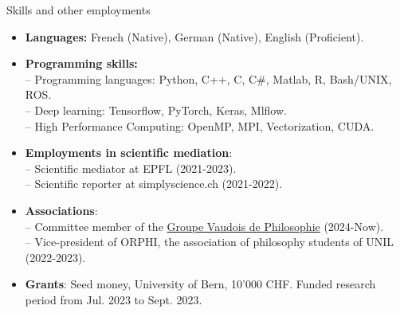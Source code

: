 \documentclass[]{mcdowellcv}
\begin{document}
    \begin{cvsection}{Skills and other employments}
        \begin{cvsubsection}{}{}{}
            \begin{itemize}
            \setlength\itemsep{0.4em}
            \item \textbf{Languages:} French (Native), German (Native), English (Proficient).
               \item \textbf{Programming skills:} \\
                    -- Programming languages: Python, C++, C, C\#, Matlab, R, Bash/UNIX, ROS. \\
                 -- Deep learning: Tensorflow, PyTorch, Keras, Mlflow. \\
		 -- High Performance Computing: OpenMP, MPI, Vectorization, CUDA. 
               
   
            \item \textbf{Employments in scientific mediation}: \\ -- Scientific mediator at EPFL (2021-2023). \\ -- Scientific reporter at simplyscience.ch (2021-2022). 
            \item \textbf{Associations}:\\ -- Committee member of the \href{https://philo-vaud.ch/}{Groupe Vaudois de Philosophie} (2024-Now). \\ -- Vice-president of ORPHI, the association of philosophy students of UNIL (2022-2023).
             \item \textbf{Grants}: Seed money, University of Bern, 10'000 CHF. Funded research period from Jul. 2023 to Sept. 2023.
              
               \end{itemize}

        \end{cvsubsection}
        
    \end{cvsection}
\end{document}
